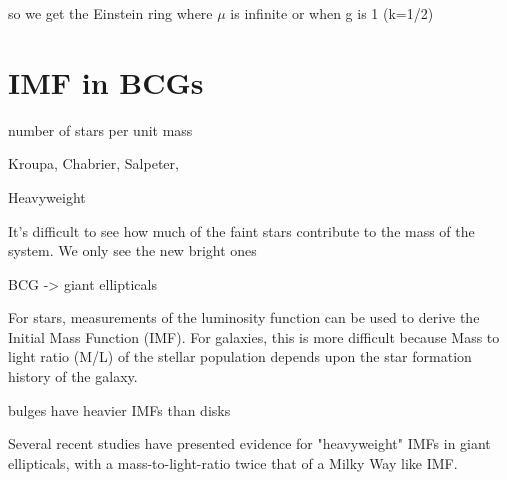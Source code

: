 so we get the Einstein ring where $\mu$ is infinite or when g is 1 (k=1/2)

\section{IMF in BCGs}

number of stars per unit mass

Kroupa, Chabrier, Salpeter, 

Heavyweight

It's difficult to see how much of the faint stars contribute to the mass of the system. We only see the new bright ones

BCG -> giant ellipticals

For stars, measurements of the luminosity function can be
used to derive the Initial Mass Function (IMF).
For galaxies, this is more difficult because Mass to light ratio (M/L) of the stellar population
depends upon the star formation history of
the galaxy.

bulges have heavier IMFs than disks

Several recent studies have presented evidence for "heavyweight" IMFs in giant ellipticals, with a mass-to-light-ratio twice that of a Milky Way like IMF.



 
 